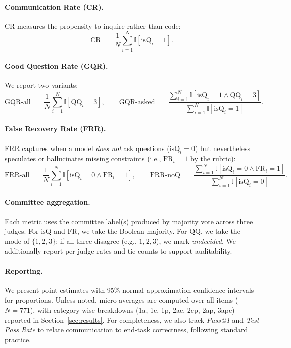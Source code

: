 \documentclass[acmsmall,screen,nonacm]{acmart}
\begin{document}
\paragraph{Communication Rate (CR).}
CR measures the propensity to inquire rather than code:
\[
\mathrm{CR} \;=\; \frac{1}{N}\sum_{i=1}^N \mathbb{I}\!\left[\mathrm{isQ}_i = 1\right].
\]

\paragraph{Good Question Rate (GQR).}
We report two variants:
\[
\mathrm{GQR\text{-}all} \;=\; \frac{1}{N}\sum_{i=1}^N \mathbb{I}\!\left[\mathrm{QQ}_i = 3\right], \qquad
\mathrm{GQR\text{-}asked} \;=\; \frac{\sum_{i=1}^N \mathbb{I}[\mathrm{isQ}_i=1 \land \mathrm{QQ}_i=3]}{\sum_{i=1}^N \mathbb{I}[\mathrm{isQ}_i=1]}.
\]

\paragraph{False Recovery Rate (FRR).}
FRR captures when a model \emph{does not} ask questions ($\mathrm{isQ}_i=0$) but nevertheless speculates or hallucinates missing constraints (i.e., $\mathrm{FR}_i=1$ by the rubric):
\[
\mathrm{FRR\text{-}all} \;=\; \frac{1}{N}\sum_{i=1}^N \mathbb{I}\!\left[\mathrm{isQ}_i=0 \land \mathrm{FR}_i=1\right], \qquad
\mathrm{FRR\text{-}noQ} \;=\; \frac{\sum_{i=1}^N \mathbb{I}[\mathrm{isQ}_i=0 \land \mathrm{FR}_i=1]}{\sum_{i=1}^N \mathbb{I}[\mathrm{isQ}_i=0]}.
\]

\paragraph{Committee aggregation.}
Each metric uses the committee label(s) produced by majority vote across three judges. For $\mathrm{isQ}$ and $\mathrm{FR}$, we take the Boolean majority. For $\mathrm{QQ}$, we take the mode of $\{1,2,3\}$; if all three disagree (e.g., $1,2,3$), we mark \emph{undecided}. We additionally report per-judge rates and tie counts to support auditability.

\paragraph{Reporting.}
We present point estimates with 95\% normal-approximation confidence intervals for proportions. Unless noted, micro-averages are computed over all items ($N{=}771$), with category-wise breakdowns (1a, 1c, 1p, 2ac, 2cp, 2ap, 3apc) reported in Section~\ref{sec:results}. For completeness, we also track \emph{Pass@1} and \emph{Test Pass Rate} to relate communication to end-task correctness, following standard practice.%
\end{document}

